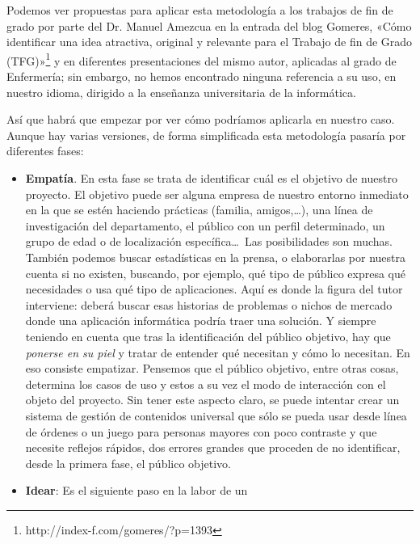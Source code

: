 \documentclass[twoside,10pt]{article}
\begin{document}
\begin{multicols}{2}
Podemos ver propuestas para aplicar esta metodología a los trabajos de fin de
grado por parte del Dr. Manuel Amezcua en la entrada del blog 
Gomeres, «Cómo
identificar una idea atractiva, original y relevante para el Trabajo de fin de
Grado (TFG)»\footnote{http://index-f.com/gomeres/?p=1393} y en diferentes
presentaciones del mismo autor, aplicadas al grado de Enfermería; sin
embargo, no hemos encontrado ninguna referencia a su uso, en nuestro
idioma,  dirigido a la enseñanza universitaria de la informática. 

Así que habrá que empezar por ver cómo podríamos aplicarla en nuestro
caso. Aunque hay varias versiones,
de forma simplificada esta metodología pasaría por diferentes fases:

\begin{itemize}
\item {\bf Empatía}. En esta fase se trata de identificar cuál es el
  objetivo de nuestro proyecto. El objetivo puede ser alguna empresa de
  nuestro entorno inmediato en la que se estén haciendo prácticas (familia,
amigos,\ldots), una línea de investigación del departamento, el público con un
perfil determinado, un grupo de edad o de localización 
específica\ldots\ Las
posibilidades son muchas. También podemos
buscar  estadísticas en la prensa, o elaborarlas por nuestra cuenta si
no existen, buscando, por ejemplo, qué tipo de público expresa qué
necesidades o usa qué tipo de aplicaciones. Aquí es donde la
figura del tutor interviene: deberá buscar esas historias de problemas o nichos
de mercado donde una aplicación informática podría traer una solución. Y
siempre teniendo en cuenta que tras la identificación del público objetivo, hay
que {\em
    ponerse en su piel} y tratar de entender qué necesitan y cómo lo
  necesitan. En eso consiste empatizar.  
Pensemos que el público objetivo, entre otras cosas, determina los casos de
uso y estos a su vez el modo de interacción con el objeto del proyecto. Sin tener este
aspecto claro, se puede intentar crear un sistema de gestión de contenidos
universal que sólo se pueda usar desde línea de órdenes o un juego para
personas mayores con poco contraste y que necesite reflejos rápidos,
dos errores grandes que proceden de no identificar, desde la primera
fase, el público objetivo. 
\item {\bf Idear}: Es el siguiente paso en la labor de un

\end{itemize}
\end{multicols}
\end{document}
